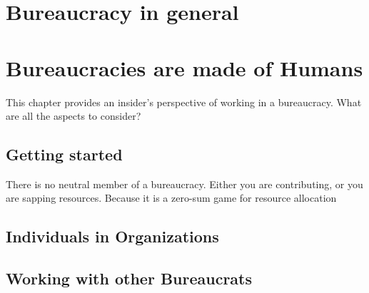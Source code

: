 \documentclass{book}
\begin{document}
\chapter{Bureaucracy in general}
   \newpage
   \newpage
  \newpage
  \newpage
  \newpage
  \newpage
  \newpage
  \newpage


\chapter{Bureaucracies are made of Humans\label{b_made_of_humans}}

This chapter provides an insider's perspective of working in a bureaucracy. What are all the aspects to consider?

  \section{Getting started}
  There is no neutral member of a bureaucracy. Either you are contributing, or you are sapping resources. Because it is a zero-sum game for resource allocation
  
    
    
    
    
    
  \newpage
  \section{Individuals in Organizations}
    
    
    
    
    
  \newpage
  \section{Working with other Bureaucrats}

\end{document}
